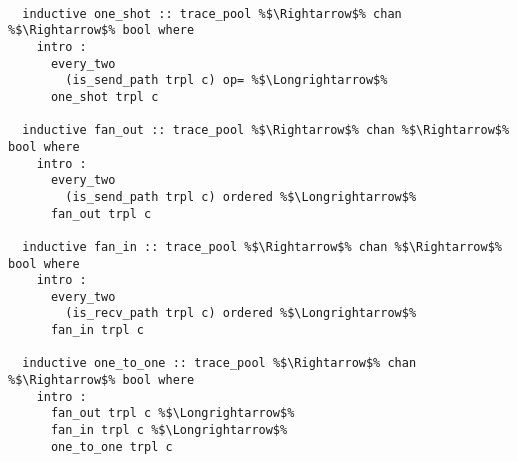 \documentclass{article}
\begin{document}
\begin{lstlisting}[style=codestyle1, escapechar=\%]

  inductive one_shot :: trace_pool %$\Rightarrow$% chan %$\Rightarrow$% bool where
    intro :
      every_two
        (is_send_path trpl c) op= %$\Longrightarrow$% 
      one_shot trpl c

  inductive fan_out :: trace_pool %$\Rightarrow$% chan %$\Rightarrow$% bool where
    intro :
      every_two
        (is_send_path trpl c) ordered %$\Longrightarrow$%
      fan_out trpl c

  inductive fan_in :: trace_pool %$\Rightarrow$% chan %$\Rightarrow$% bool where
    intro :
      every_two
        (is_recv_path trpl c) ordered %$\Longrightarrow$% 
      fan_in trpl c

  inductive one_to_one :: trace_pool %$\Rightarrow$% chan %$\Rightarrow$% bool where
    intro :
      fan_out trpl c %$\Longrightarrow$%
      fan_in trpl c %$\Longrightarrow$% 
      one_to_one trpl c

  \end{lstlisting}
\end{document}
